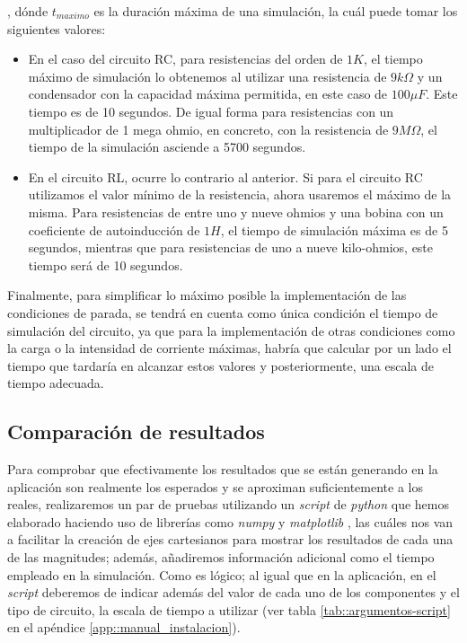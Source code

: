 \documentclass[../main.tex]{subfiles}
\begin{document}
, dónde $t_{maximo}$ es la duración máxima de una simulación, la cuál puede tomar los siguientes valores:

\begin{itemize}
    \item En el caso del circuito RC, para resistencias del orden de $1K$, el tiempo máximo de simulación lo obtenemos al utilizar una resistencia de $9k \Omega$ y un condensador con la capacidad máxima permitida, en este caso de $100 \mu F$. Este tiempo es de 10 segundos. De igual forma para resistencias con un multiplicador de 1 mega ohmio, en concreto, con la resistencia de $9M \Omega$, el tiempo de la simulación asciende a 5700 segundos.
    
    \item En el circuito RL, ocurre lo contrario al anterior. Si para el circuito RC utilizamos el valor mínimo de la resistencia, ahora usaremos el máximo de la misma. Para resistencias de entre uno y nueve ohmios y una bobina con un coeficiente de autoinducción de $1H$, el tiempo de simulación máxima es de 5 segundos, mientras que para resistencias de uno a nueve kilo-ohmios, este tiempo será de 10 segundos.
\end{itemize}


Finalmente, para simplificar lo máximo posible la implementación de las condiciones de parada, se tendrá en cuenta como única condición el tiempo de simulación del circuito, ya que para la implementación de otras condiciones como la carga o la intensidad de corriente máximas, habría que calcular por un lado el tiempo que tardaría en alcanzar estos valores y posteriormente, una escala de tiempo adecuada.






\subsection{Comparación de resultados}
Para comprobar que efectivamente los resultados que se están generando en la aplicación son realmente los esperados y se aproximan suficientemente a los reales, realizaremos un par de pruebas utilizando un \textit{script} de \textit{python} que hemos elaborado haciendo uso de librerías como \textit{numpy} \cite{numpy} y \textit{matplotlib} \cite{matplotlib}, las cuáles nos van a facilitar la creación de ejes cartesianos para mostrar los resultados de cada una de las magnitudes; además, añadiremos información adicional como el tiempo empleado en la simulación. Como es lógico; al igual que en la aplicación, en el \textit{script} deberemos de indicar además del valor de cada uno de los componentes y el tipo de circuito, la escala de tiempo a utilizar (ver tabla \ref{tab::argumentos-script} en el apéndice \ref{app::manual_instalacion}).\\ 
\end{document}
